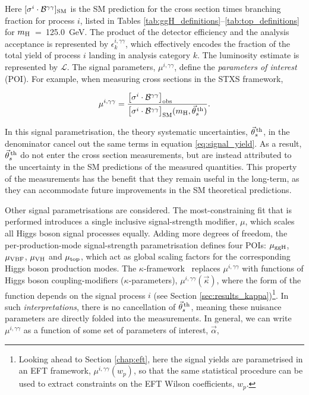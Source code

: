 \noindent
Here $[\sigma^i \cdot \mathcal{B}^{\gamma\gamma}]_{\rm{SM}}$ is the SM prediction for the cross section times branching fraction for process $i$, listed in Tables \ref{tab:ggH_definitions}--\ref{tab:top_definitions} for $m_{\rm{H}}$~=~125.0~GeV. The product of the detector efficiency and the analysis acceptance is represented by $\epsilon^{i,\gamma\gamma}_k$, which effectively encodes the fraction of the total yield of process $i$ landing in analysis category $k$. The luminosity estimate is represented by $\mathcal{L}$. The signal parameters, $\mu^{i,\gamma\gamma}$, define the \textit{parameters of interest} (POI). For example, when measuring cross sections in the STXS framework,

\begin{equation}\label{eq:mu_stxs}
    \mu^{i,\gamma\gamma} = \frac{\big[\sigma^i \cdot \mathcal{B}^{\gamma\gamma} \big]_{\rm{obs}}\hfill}{\big[\sigma^i \cdot \mathcal{B}^{\gamma\gamma} \big]_{\rm{SM}}(m_{\rm{H}},\vec{\theta}^{\,\rm{th}}_{s})}.
\end{equation}

\noindent
In this signal parametrisation, the theory systematic uncertainties, $\vec{\theta}^{\,\rm{th}}_{s}$, in the denominator cancel out the same terms in equation \ref{eq:signal_yield}. As a result, $\vec{\theta}^{\,\rm{th}}_{s}$ do not enter the cross section measurements, but are instead attributed to the uncertainty in the SM predictions of the measured quantities. This property of the measurements has the benefit that they remain useful in the long-term, as they can accommodate future improvements in the SM theoretical predictions.

Other signal parametrisations are considered. The most-constraining fit that is performed introduces a single inclusive signal-strength modifier, $\mu$, which scales all Higgs boson signal processes equally. Adding more degrees of freedom, the per-production-mode signal-strength parametrisation defines four POIs: $\mu_{\rm{ggH}}$, $\mu_{\rm{VBF}}$, $\mu_{\rm{VH}}$ and $\mu_{\rm{top}}$, which act as global scaling factors for the corresponding Higgs boson production modes. The $\kappa$-framework~\cite{Heinemeyer:2013tqa} replaces $\mu^{i,\gamma\gamma}$ with functions of Higgs boson coupling-modifiers ($\kappa$-parameters), $\mu^{i,\gamma\gamma}(\vec{\kappa})$, where the form of the function depends on the signal process $i$ (see Section \ref{sec:results_kappa})\footnote{Looking ahead to Section \ref{chap:eft}, here the signal yields are parametrised in an EFT framework, $\mu^{i,\gamma\gamma}(w_p)$, so that the same statistical procedure can be used to extract constraints on the EFT Wilson coefficients, $w_p$.}. In such \textit{interpretations}, there is no cancellation of $\vec{\theta}^{\,\rm{th}}_{s}$, meaning these nuisance parameters are directly folded into the measurements. In general, we can write $\mu^{i,\gamma\gamma}$ as a function of some set of parameters of interest, $\vec{\alpha}$,

